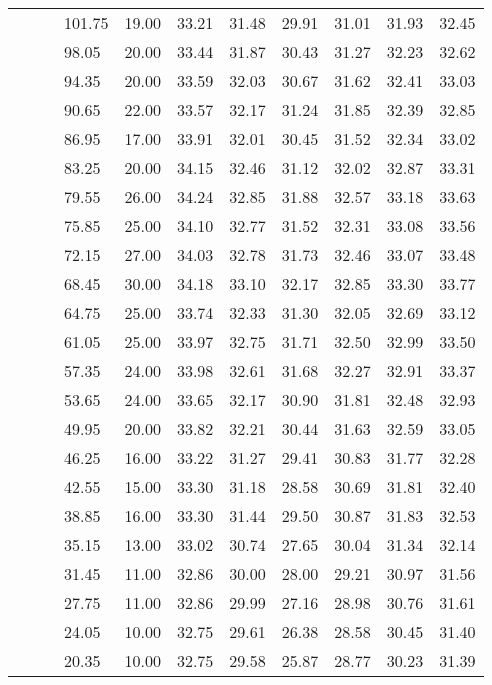 \begin{longtable}{llllrrrrrrr}
   &  &  & 101.75 & 19.00 & 33.21 & 31.48 & 29.91 & 31.01 & 31.93 & 32.45 \\ 
   &  &  & 98.05 & 20.00 & 33.44 & 31.87 & 30.43 & 31.27 & 32.23 & 32.62 \\ 
   &  &  & 94.35 & 20.00 & 33.59 & 32.03 & 30.67 & 31.62 & 32.41 & 33.03 \\ 
   &  &  & 90.65 & 22.00 & 33.57 & 32.17 & 31.24 & 31.85 & 32.39 & 32.85 \\ 
   &  &  & 86.95 & 17.00 & 33.91 & 32.01 & 30.45 & 31.52 & 32.34 & 33.02 \\ 
   &  &  & 83.25 & 20.00 & 34.15 & 32.46 & 31.12 & 32.02 & 32.87 & 33.31 \\ 
   &  &  & 79.55 & 26.00 & 34.24 & 32.85 & 31.88 & 32.57 & 33.18 & 33.63 \\ 
   &  &  & 75.85 & 25.00 & 34.10 & 32.77 & 31.52 & 32.31 & 33.08 & 33.56 \\ 
   &  &  & 72.15 & 27.00 & 34.03 & 32.78 & 31.73 & 32.46 & 33.07 & 33.48 \\ 
   &  &  & 68.45 & 30.00 & 34.18 & 33.10 & 32.17 & 32.85 & 33.30 & 33.77 \\ 
   &  &  & 64.75 & 25.00 & 33.74 & 32.33 & 31.30 & 32.05 & 32.69 & 33.12 \\ 
   &  &  & 61.05 & 25.00 & 33.97 & 32.75 & 31.71 & 32.50 & 32.99 & 33.50 \\ 
   &  &  & 57.35 & 24.00 & 33.98 & 32.61 & 31.68 & 32.27 & 32.91 & 33.37 \\ 
   &  &  & 53.65 & 24.00 & 33.65 & 32.17 & 30.90 & 31.81 & 32.48 & 32.93 \\ 
   &  &  & 49.95 & 20.00 & 33.82 & 32.21 & 30.44 & 31.63 & 32.59 & 33.05 \\ 
   &  &  & 46.25 & 16.00 & 33.22 & 31.27 & 29.41 & 30.83 & 31.77 & 32.28 \\ 
   &  &  & 42.55 & 15.00 & 33.30 & 31.18 & 28.58 & 30.69 & 31.81 & 32.40 \\ 
   &  &  & 38.85 & 16.00 & 33.30 & 31.44 & 29.50 & 30.87 & 31.83 & 32.53 \\ 
   &  &  & 35.15 & 13.00 & 33.02 & 30.74 & 27.65 & 30.04 & 31.34 & 32.14 \\ 
   &  &  & 31.45 & 11.00 & 32.86 & 30.00 & 28.00 & 29.21 & 30.97 & 31.56 \\ 
   &  &  & 27.75 & 11.00 & 32.86 & 29.99 & 27.16 & 28.98 & 30.76 & 31.61 \\ 
   &  &  & 24.05 & 10.00 & 32.75 & 29.61 & 26.38 & 28.58 & 30.45 & 31.40 \\ 
   &  &  & 20.35 & 10.00 & 32.75 & 29.58 & 25.87 & 28.77 & 30.23 & 31.39 \\ 

\end{longtable}
